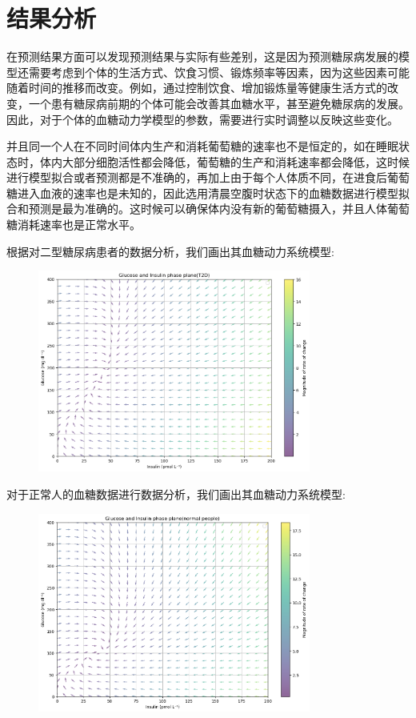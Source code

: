 \chapter{结果分析}

在预测结果方面可以发现预测结果与实际有些差别，这是因为预测糖尿病发展的模型还需要考虑到个体的生活方式、饮食习惯、锻炼频率等因素，因为这些因素可能随着时间的推移而改变。例如，通过控制饮食、增加锻炼量等健康生活方式的改变，一个患有糖尿病前期的个体可能会改善其血糖水平，甚至避免糖尿病的发展。因此，对于个体的血糖动力学模型的参数，需要进行实时调整以反映这些变化。

并且同一个人在不同时间体内生产和消耗葡萄糖的速率也不是恒定的，如在睡眠状态时，体内大部分细胞活性都会降低，葡萄糖的生产和消耗速率都会降低，这时候进行模型拟合或者预测都是不准确的，再加上由于每个人体质不同，在进食后葡萄糖进入血液的速率也是未知的，因此选用清晨空腹时状态下的血糖数据进行模型拟合和预测是最为准确的。这时候可以确保体内没有新的葡萄糖摄入，并且人体葡萄糖消耗速率也是正常水平。

根据对二型糖尿病患者的数据分析，我们画出其血糖动力系统模型:
\begin{figure}[H]
    \centering
    \includegraphics[width=0.8\textwidth]{Img/t2dphase.png}
    \label{fig:2type}
\end{figure}

对于正常人的血糖数据进行数据分析，我们画出其血糖动力系统模型:
\begin{figure}[H]
    \centering
    \includegraphics[width=0.8\textwidth]{Img/normalphase.png}
    \label{fig:normal}
\end{figure}

